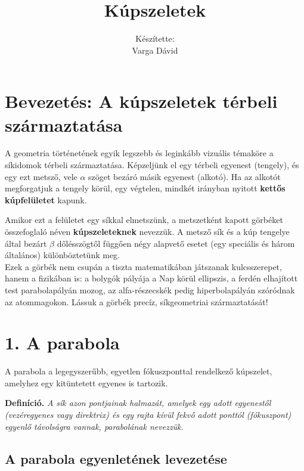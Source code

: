 \documentclass[12pt, a4paper]{article}
\newcommand{\textbfr}[1]{\textbf{\textcolor{bvred}{#1}}}
\begin{document}
\title{\textbfr{Kúpszeletek}}
\author{Készítette:\\Varga Dávid}
\date{}
\maketitle

\section*{Bevezetés: A kúpszeletek térbeli származtatása}

A geometria történetének egyik legszebb és leginkább vizuális témaköre a síkidomok térbeli származtatása. Képzeljünk el egy térbeli egyenest (tengely), és egy ezt metsző, vele $\alpha$ szöget bezáró másik egyenest (alkotó). Ha az alkotót megforgatjuk a tengely körül, egy végtelen, mindkét irányban nyitott \textbfr{kettős kúpfelületet} kapunk. 

Amikor ezt a felületet egy síkkal elmetszünk, a metszetként kapott görbéket összefoglaló néven \textbfr{kúpszeleteknek} nevezzük. A metsző sík és a kúp tengelye által bezárt $\beta$ dőlésszögtől függően négy alapvető esetet (egy speciális és három általános) különböztetünk meg. \\



Ezek a görbék nem csupán a tiszta matematikában játszanak kulcsszerepet, hanem a fizikában is: a bolygók pályája a Nap körül ellipszis, a ferdén elhajított test parabolapályán mozog, az alfa-részecskék pedig hiperbolapályán szóródnak az atommagokon. Lássuk a görbék precíz, síkgeometriai származtatását!

\section*{1. A parabola}

A parabola a legegyszerűbb, egyetlen fókuszponttal rendelkező kúpszelet, amelyhez egy kitüntetett egyenes is tartozik.

\textbf{Definíció.} \textit{A sík azon pontjainak halmazát, amelyek egy adott egyenestől (vezéregyenes vagy direktrix) és egy rajta kívül fekvő adott ponttól (fókuszpont) egyenlő távolságra vannak, \textcolor{bvred}{parabolának} nevezzük.}

\subsection*{A parabola egyenletének levezetése}
\end{document}
